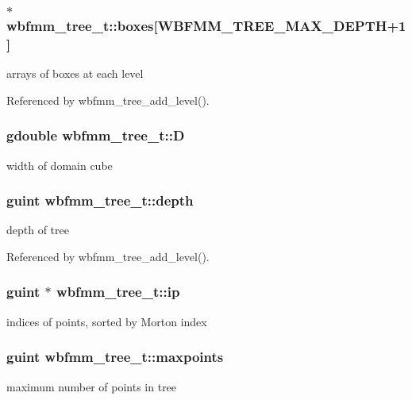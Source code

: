 \subsubsection[{boxes}]{$\ast$ wbfmm\+\_\+tree\+\_\+t\+::boxes[W\+B\+F\+M\+M\+\_\+\+T\+R\+E\+E\+\_\+\+M\+A\+X\+\_\+\+D\+E\+P\+T\+H+1]}\label{structwbfmm__tree__t_a2cec33cf396af727261fdb357e2a4de2}
arrays of boxes at each level 

Referenced by wbfmm\+\_\+tree\+\_\+add\+\_\+level().

\subsubsection[{D}]{\setlength{\rightskip}{0pt plus 5cm}gdouble wbfmm\+\_\+tree\+\_\+t\+::\+D}\label{structwbfmm__tree__t_a3f8ee26d3fe9c69bb5ba7583711c2175}
width of domain cube 
\subsubsection[{depth}]{\setlength{\rightskip}{0pt plus 5cm}guint wbfmm\+\_\+tree\+\_\+t\+::depth}\label{structwbfmm__tree__t_ad6a069db29489d75083169ca0bca9901}
depth of tree 

Referenced by wbfmm\+\_\+tree\+\_\+add\+\_\+level().

\subsubsection[{ip}]{\setlength{\rightskip}{0pt plus 5cm}guint $\ast$ wbfmm\+\_\+tree\+\_\+t\+::ip}\label{structwbfmm__tree__t_ad1b0ef45823888a234d18840d655f8e0}
indices of points, sorted by Morton index 
\subsubsection[{maxpoints}]{\setlength{\rightskip}{0pt plus 5cm}guint wbfmm\+\_\+tree\+\_\+t\+::maxpoints}\label{structwbfmm__tree__t_a81074e586538485590e38b9bc9274326}
maximum number of points in tree 
